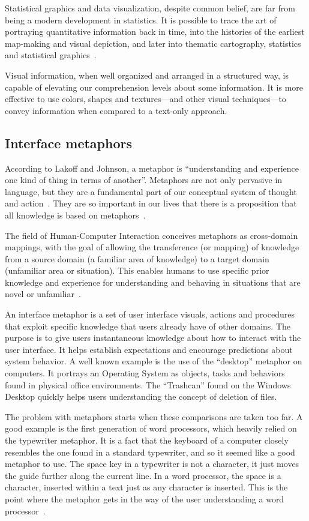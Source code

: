 Statistical graphics and data visualization, despite common belief, are far from
being a modern development in statistics. It is possible to trace the art of
portraying quantitative information back in time, into the histories of the
earliest map-making and visual depiction, and later into thematic cartography,
statistics and statistical graphics~\cite{friendly2008brief}.

Visual information, when well organized and arranged in a structured way, is
capable of elevating our comprehension levels about some information. It is more
effective to use colors, shapes and textures---and other visual techniques---to
convey information when compared to a text-only approach.

\subsection{Interface metaphors}

According to Lakoff and Johnson, a metaphor is ``understanding and experience
one kind of thing in terms of another''. Metaphors are not only pervasive in
language, but they are a fundamental part of our conceptual system of thought
and action~\cite{lakoff1980metaphors}. They are so important in our lives
that there is a proposition that all knowledge is based on
metaphors~\cite{indurkhya1994thesis}.

The field of Human-Computer Interaction conceives metaphors as cross-domain
mappings, with the goal of allowing the transference (or mapping) of knowledge
from a source domain (a familiar area of knowledge) to a target domain
(unfamiliar area or situation). This enables humans to use specific prior
knowledge and experience for understanding and behaving in situations that are
novel or unfamiliar~\cite{helander1997handbook}.

An interface metaphor is a set of user interface visuals, actions and procedures
that exploit specific knowledge that users already have of other domains. The
purpose is to give users instantaneous knowledge about how to interact with the
user interface. It helps establish expectations and encourage predictions about
system behavior. A well known example is the use of the ``desktop'' metaphor on
computers. It portrays an Operating System as objects, tasks and behaviors found
in physical office environments. The ``Trashcan'' found on the Windows Desktop
quickly helps users understanding the concept of deletion of files.

The problem with metaphors starts when these comparisons are taken too far. A
good example is the first generation of word processors, which heavily relied on
the typewriter metaphor. It is a fact that the keyboard of a computer closely
resembles the one found in a standard typewriter, and so it seemed like a good
metaphor to use. The space key in a typewriter is not a character, it just moves
the guide further along the current line. In a word processor, the space is a
character, inserted within a text just as any character is inserted.
This is the point where the metaphor gets in the way of the user understanding a
word processor~\cite{dix2004human, helander1997handbook}.

